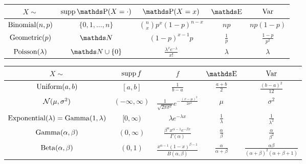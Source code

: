 \begin{table}[H]
  \centering
  \begin{tabular}{c  c  c  c  c}
   \(X \sim \) & \(\supp \P(X = \cdot)\) & \(\P(X = x)\) & \(\E\) & \(\operatorname{Var}\)
  \\ \hline 
  \(\operatorname{Binomial}(n, p)\) 
    & \(\{0, 1, \dots, n\}\) 
    & \(\binom{n}{x} p^x (1-p)^{n-x}\) 
    & \(np\) 
    & \(np(1-p)\) 
  \vspace{0.5em}\\
  \(\operatorname{Geometric}(p)\) 
    & \(\NN\) 
    & \((1-p)^{x-1} p\) 
    & \(\frac{1}{p}\) 
    & \(\frac{1-p}{p^2}\) 
  \vspace{0.5em}\\
  \(\operatorname{Poisson}(\lambda)\) 
    & \(\NN \cup \{0\}\) 
    & \(\frac{\lambda^x e^{-\lambda}}{x!}\) 
    & \(\lambda\) 
    & \(\lambda\) 
  \end{tabular}
\end{table}

\begin{table}[H]
  \centering
  \begin{tabular}{c  c  c  c  c}
   \(X \sim \) & \(\operatorname{supp} f\) & \(f\) & \(\E\) & \(\operatorname{Var}\)
  \\ \hline 
  \(\operatorname{Uniform}(a, b)\) 
    & \([a, b]\) 
    & \(\frac{1}{b-a}\) 
    & \(\frac{a+b}{2}\) 
    & \(\frac{(b-a)^2}{12}\) 
  \vspace{0.5em}\\
  \(\mathcal{N}(\mu, \sigma^2)\) 
    & \((-\infty, \infty)\) 
    & \(\frac{1}{\sqrt{2\pi\sigma^2}} e^{-\frac{(x-\mu)^2}{2\sigma^2}}\) 
    & \(\mu\) 
    & \(\sigma^2\) 
  \vspace{0.5em}\\
  \(\operatorname{Exponential}(\lambda) = \operatorname{Gamma}(1, \lambda)\)
    & \([0, \infty)\) 
    & \(\lambda e^{-\lambda x}\) 
    & \(\frac{1}{\lambda}\) 
    & \(\frac{1}{\lambda^2}\) 
  \vspace{0.5em}\\
  \(\operatorname{Gamma}(\alpha, \beta)\) 
    & \((0, \infty)\) 
    & \(\frac{\beta^\alpha x^{\alpha - 1} e^{-\beta x}}{\Gamma(\alpha)}\) 
    & \(\frac{\alpha}{\beta}\) 
    & \(\frac{\alpha}{\beta^2}\) 
  \vspace{0.5em}\\
  \(\operatorname{Beta}(\alpha, \beta)\) 
    & \((0, 1)\) 
    & \(\frac{x^{\alpha - 1} (1 - x)^{\beta - 1}}{B(\alpha, \beta)}\) 
    & \(\frac{\alpha}{\alpha + \beta}\) 
    & \(\frac{\alpha \beta}{(\alpha + \beta)^2 (\alpha + \beta + 1)}\) 
  \end{tabular}
\end{table}

